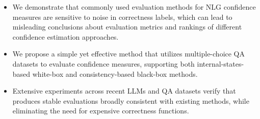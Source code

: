 \begin{itemize}[leftmargin=*,nosep]
    \item We demonstrate that commonly used evaluation methods for NLG confidence measures are sensitive to noise in correctness labels, which can lead to misleading conclusions about evaluation metrics and rankings of different confidence estimation approaches.
    \item We propose a simple yet effective method that utilizes multiple-choice QA datasets to evaluate confidence measures, supporting both internal-states-based white-box and consistency-based black-box methods.
    \item Extensive experiments across recent LLMs and QA datasets verify that \uqeval produces stable evaluations broadly consistent with existing methods, while eliminating the need for expensive correctness functions.
\end{itemize}

